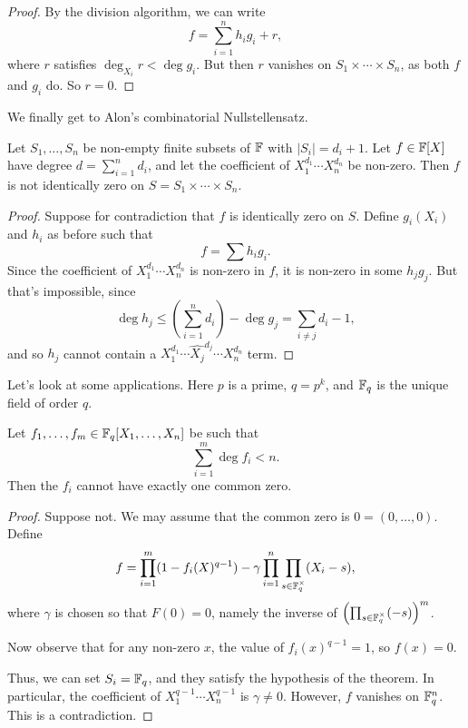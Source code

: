 \documentclass[a4paper]{article}
\begin{document}
\begin{proof}
  By the division algorithm, we can write
  \[
    f = \sum_{i = 1}^n h_i g_i + r,
  \]
  where $r$ satisfies $\deg_{X_i} r < \deg g_i$. But then $r$ vanishes on $S_1 \times \cdots \times S_n$, as both $f$ and $g_i$ do. So $r = 0$.
\end{proof}

We finally get to Alon's combinatorial Nullstellensatz.
\begin{thm}
  Let $S_1, \ldots, S_n$ be non-empty finite subsets of $\mathbb{F}$ with $|S_i| = d_i + 1$. Let $f \in \mathbb{F}[X]$ have degree $d = \sum_{i = 1}^n d_i$, and let the coefficient of $X_1^{d_1} \cdots X_n^{d_n}$ be non-zero. Then $f$ is not identically zero on $S = S_1 \times \cdots \times S_n$.
\end{thm}

\begin{proof}
  Suppose for contradiction that $f$ is identically zero on $S$. Define $g_i(X_i)$ and $h_i$ as before such that
  \[
    f = \sum h_i g_i.
  \]
  Since the coefficient of $X_1^{d_1} \cdots X_n^{d_n}$ is non-zero in $f$, it is non-zero in some $h_j g_j$. But that's impossible, since
  \[
    \deg h_j \leq \left(\sum_{i = 1}^n d_i \right) - \deg g_j = \sum_{i \not= j} d_i - 1,
  \]
  and so $h_j$ cannot contain a $X_1^{d_1} \cdots \hat{X_j}^{d_j} \cdots X_n^{d_n}$ term.
\end{proof}

Let's look at some applications. Here $p$ is a prime, $q = p^k$, and $\mathbb{F}_q$ is the unique field of order $q$.
\begin{thm}[Chevalley, 1935]
  Let $f_1, \ldots, f_m \in \mathbb{F}_q[X_1, \ldots, X_n]$ be such that
  \[
    \sum_{i = 1}^m \deg f_i < n.
  \]
  Then the $f_i$ cannot have exactly one common zero.
\end{thm}

\begin{proof}
  Suppose not. We may assume that the common zero is $0 = (0, \ldots, 0)$. Define
  \[
    f = \prod_{i = 1}^m (1 - f_i(X)^{q - 1}) - \gamma \prod_{i = 1}^n \prod_{s \in \mathbb{F}_q^\times} (X_i - s),
  \]
  where $\gamma$ is chosen so that $F(0) = 0$, namely the inverse of $\left(\prod_{s \in \mathbb{F}_q^\times} (-s)\right)^m$.

  Now observe that for any non-zero $x$, the value of $f_i(x)^{q - 1} = 1$, so $f(x) = 0$.

  Thus, we can set $S_i = \mathbb{F}_q$, and they satisfy the hypothesis of the theorem. In particular, the coefficient of $X_1^{q - 1} \cdots X_n^{q - 1}$ is $\gamma \not= 0$. However, $f$ vanishes on $\mathbb{F}_q^n$. This is a contradiction.
\end{proof}
\end{document}
